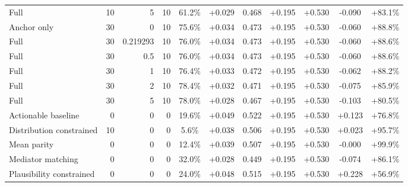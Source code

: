 \begin{table}[htbp]
\begin{tabular}{lrrrccccccc}
Full & 10 & 5 & 10 & 61.2\% & +0.029 & 0.468 & +0.195 & +0.530 & -0.090 & +83.1\% \\
Anchor only & 30 & 0 & 10 & 75.6\% & +0.034 & 0.473 & +0.195 & +0.530 & -0.060 & +88.8\% \\
Full & 30 & 0.219293 & 10 & 76.0\% & +0.034 & 0.473 & +0.195 & +0.530 & -0.060 & +88.6\% \\
Full & 30 & 0.5 & 10 & 76.0\% & +0.034 & 0.473 & +0.195 & +0.530 & -0.060 & +88.6\% \\
Full & 30 & 1 & 10 & 76.4\% & +0.033 & 0.472 & +0.195 & +0.530 & -0.062 & +88.2\% \\
Full & 30 & 2 & 10 & 78.4\% & +0.032 & 0.471 & +0.195 & +0.530 & -0.075 & +85.9\% \\
Full & 30 & 5 & 10 & 78.0\% & +0.028 & 0.467 & +0.195 & +0.530 & -0.103 & +80.5\% \\
Actionable baseline & 0 & 0 & 0 & 19.6\% & +0.049 & 0.522 & +0.195 & +0.530 & +0.123 & +76.8\% \\
Distribution constrained & 10 & 0 & 0 & 5.6\% & +0.038 & 0.506 & +0.195 & +0.530 & +0.023 & +95.7\% \\
Mean parity & 0 & 0 & 0 & 12.4\% & +0.039 & 0.507 & +0.195 & +0.530 & -0.000 & +99.9\% \\
Mediator matching & 0 & 0 & 0 & 32.0\% & +0.028 & 0.449 & +0.195 & +0.530 & -0.074 & +86.1\% \\
Plausibility constrained & 0 & 0 & 0 & 24.0\% & +0.048 & 0.515 & +0.195 & +0.530 & +0.228 & +56.9\% \\
\bottomrule
\end{tabular}
\end{table}